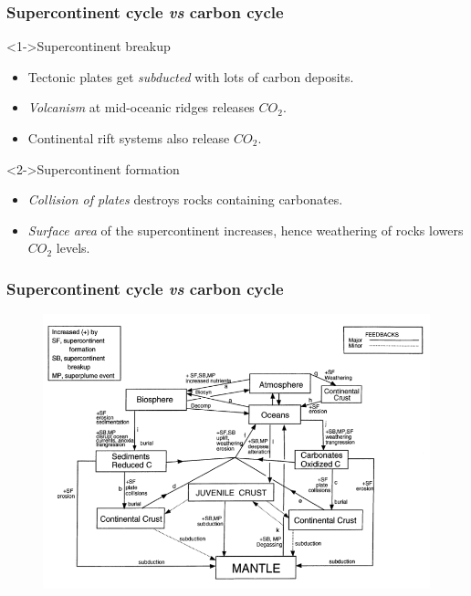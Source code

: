 \documentclass{beamer}
\begin{document}
        \begin{frame}
        \frametitle{Supercontinent cycle \textit{vs} carbon cycle}
                \begin{block}<1->{Supercontinent breakup}
                        \begin{itemize}
                                \item Tectonic plates get \emph{subducted} with lots of carbon deposits.
                                \item \emph{Volcanism} at mid-oceanic ridges releases $CO_2$.
                                \item Continental rift systems also release $CO_2$.
                        \end{itemize}
                \end{block}
                \begin{block}<2->{Supercontinent formation}
                        \begin{itemize}
                                \item \emph{Collision of plates} destroys rocks containing carbonates.
                                \item \emph{Surface area} of the supercontinent increases, hence weathering of rocks lowers $CO_2$ levels.
                        \end{itemize}
                \end{block}
        \end{frame}

        \begin{frame}
        \frametitle{Supercontinent cycle \textit{vs} carbon cycle}
        \begin{figure}
        \begin{center}
                \includegraphics[width=\textwidth]{feedback.png}
        \end{center}
        \end{figure}
        \end{frame}
\end{document}
